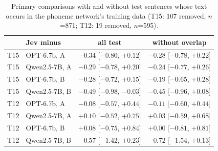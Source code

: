 \begin{table}[h]
\centering\scriptsize
\setlength{\tabcolsep}{1.5pt}
\begin{tabular}{llcc}
\toprule
& Jev minus & all test & without overlap \\
\midrule
T15 & OPT-6.7b, A & $-0.34$ [$-0.80$, $+0.12$] & $-0.28$ [$-0.78$, $+0.22$] \\
T15 & Qwen2.5-7B, A & $-0.29$ [$-0.78$, $+0.20$] & $-0.24$ [$-0.77$, $+0.26$] \\
T15 & OPT-6.7b, B & $-0.28$ [$-0.72$, $+0.15$] & $-0.19$ [$-0.65$, $+0.28$] \\
T15 & Qwen2.5-7B, B & $-0.49$ [$-0.98$, $-0.03$] & $-0.45$ [$-0.96$, $+0.08$] \\
T12 & OPT-6.7b, A & $-0.08$ [$-0.57$, $+0.44$] & $-0.11$ [$-0.60$, $+0.44$] \\
T12 & Qwen2.5-7B, A & $+0.10$ [$-0.52$, $+0.75$] & $+0.03$ [$-0.59$, $+0.68$] \\
T12 & OPT-6.7b, B & $+0.08$ [$-0.75$, $+0.84$] & $+0.00$ [$-0.81$, $+0.81$] \\
T12 & Qwen2.5-7B, B & $-0.57$ [$-1.42$, $+0.23$] & $-0.72$ [$-1.54$, $+0.13$] \\
\bottomrule
\end{tabular}
\caption{Primary comparisons with and without test sentences whose text occurs in the phoneme network's training data (T15: 107 removed, $n$=871; T12: 19 removed, $n$=595).}
\label{tab:overlap}
\end{table}
